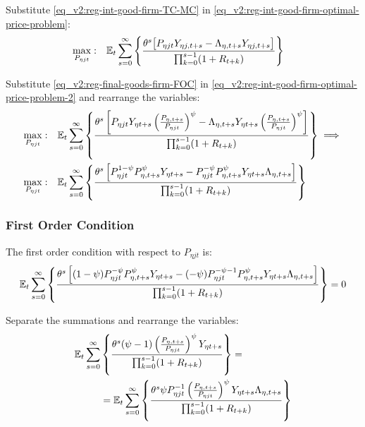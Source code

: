 \documentclass[../thesis.tex]{subfiles}
\begin{document}

Substitute \ref{eq_v2:reg-int-good-firm-TC-MC} in \ref{eq_v2:reg-int-good-firm-optimal-price-problem}:
\begin{align}
	\label{eq_v2:reg-int-good-firm-optimal-price-problem-2}
	\max_{P_{\eta jt}}: & \quad {\mathbb{E}_{t}} \sum_{s=0}^{\infty} \left\{ \frac{\theta^s \big[ P_{\eta jt} Y_{\eta j,t+s} - \Lambda_{\eta, t+s} Y_{\eta j,t+s} \big]}{\prod_{k=0}^{s-1}(1+R_{t+k})} \right\}
\end{align}

Substitute \ref{eq_v2:reg-final-goods-firm-FOC} in \ref{eq_v2:reg-int-good-firm-optimal-price-problem-2} and rearrange the variables:
\begin{align}
	\max_{P_{\eta jt}}: & \quad {\mathbb{E}_{t}} \sum_{s=0}^{\infty} \left\{ \frac{\theta^s \left[ P_{\eta jt} Y_{\eta t+s} \left( \frac{P_{\eta, t+s}}{P_{\eta jt}} \right)^{\psi} - \Lambda_{\eta, t+s} Y_{\eta t+s} \left( \frac{P_{\eta, t+s}}{P_{\eta jt}} \right)^{\psi} \right]}{\prod_{k=0}^{s-1}(1+R_{t+k})} \right\} \implies \nonumber 
	\\
	\max_{P_{\eta jt}}: & \quad {\mathbb{E}_{t}} \sum_{s=0}^{\infty} \left\{ \frac{\theta^s \left[ P_{\eta jt}^{1-\psi} P_{\eta, t+s}^{\psi} Y_{\eta t+s} - P_{\eta jt}^{-\psi} P_{\eta, t+s}^{\psi} Y_{\eta t+s} \Lambda_{\eta, t+s} \right]}{\prod_{k=0}^{s-1}(1+R_{t+k})} \right\} \nonumber
\end{align}


\subsubsection*{First Order Condition}

The first order condition with respect to $P_{\eta jt}$ is:
\begin{align}
	& \quad {\mathbb{E}_{t}} \sum_{s=0}^{\infty} \left\{ \frac{\theta^s \left[ (1-\psi) P_{\eta jt}^{-\psi} P_{\eta, t+s}^{\psi} Y_{\eta t+s} - (-\psi) P_{\eta jt}^{-\psi-1} P_{\eta, t+s}^{\psi} Y_{\eta t+s} \Lambda_{\eta, t+s} \right]}{\prod_{k=0}^{s-1}(1+R_{t+k})} \right\} = 0 \nonumber
\end{align}


Separate the summations and rearrange the variables:
\begin{align}
	\begin{split}
		{\mathbb{E}_{t}} \sum_{s=0}^{\infty} &\left\{ \frac{\theta^s (\psi-1) \left( \frac{P_{\eta, t+s}} {P_{\eta jt}} \right)^{\psi} Y_{\eta t+s}} {\prod_{k=0}^{s-1} (1+R_{t+k})} \right\} = \\
		&= {\mathbb{E}_{t}} \sum_{s=0}^{\infty} \left\{ \frac{\theta^s \psi P_{\eta jt}^{-1} \left( \frac{P_{\eta, t+s}} {P_{\eta jt}} \right)^{\psi} Y_{\eta t+s} \Lambda_{\eta, t+s}}{\prod_{k=0}^{s-1}(1+R_{t+k})} \right\} \label{eq_v2:reg-int-good-firm-optimal-price-FOC}
	\end{split}
\end{align}
\end{document}
